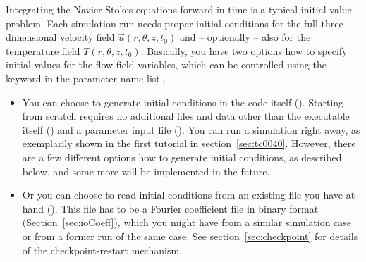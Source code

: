 \documentclass[a4paper, 11pt, DIV=11]{scrartcl}
\begin{document}
Integrating the Navier-Stokes equations forward in time is a typical initial
value problem. Each simulation run needs proper initial conditions for the
full three-dimensional velocity field $\vec{u}(r,\theta,z,t_0)$ and --
optionally -- also for the temperature field $T(r,\theta,z,t_0)$. Basically,
you have two options how to specify initial values for the flow field
variables, which can be controlled using the keyword  in the
parameter name list .
\begin{itemize}
\item 
You can choose to generate initial conditions in the code itself
(). Starting from scratch requires no additional
files and data other than the executable itself ()
and a parameter input file (). You can run a
simulation right away, as exemplarily shown in the first tutorial
in section~\ref{sec:tc0040}. However, there are a few different
options how to generate initial conditions, as described below, and
some more will be implemented in the future.
\item
Or you can choose to read initial conditions from an existing file
you have at hand (). This file has to be a Fourier
coefficient file in binary format (Section~\ref{sec:ioCoeff}), which
you might have from a similar simulation case or from a former run
of the same case. See section~\ref{sec:checkpoint} for details of
the checkpoint-restart mechanism.
\end{itemize}
\end{document}

